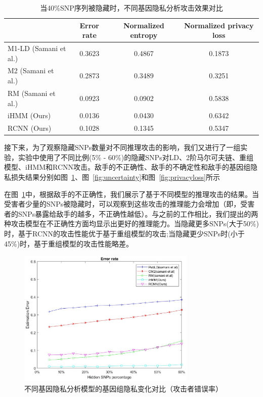 \begin{table}
	\caption{当40\%SNP序列被隐藏时，不同基因隐私分析攻击效果对比}
	\label{tab:performance-40per}
	\begin{tabular}{lccc}
		\hline
		& Error rate & Normalized entropy & Normalized privacy loss \\
		\hline
		M1-LD (Samani et al.) & 0.3623 & 0.4867 & 0.1873 \\
		M2 (Samani et al.)    & 0.2873 & 0.3489 & 0.3251 \\
		RM (Samani et al.)    & 0.0923 & 0.0902 & 0.5838 \\
		iHMM (Ours)          & 0.0136 & 0.0430 & 0.6342 \\
		RCNN (Ours)          & 0.1028 & 0.1345 & 0.5347\\
		\hline
	\end{tabular}
\end{table}

接下来，为了观察隐藏SNPs数量对不同推理攻击的影响，我们又进行了一组实验，实验中使用了不同比例(5\% - 60\%)的隐藏SNPs对LD、2阶马尔可夫链、重组模型、iHMM和RCNN攻击。敌手的不正确性、敌手的不确定性和敌手的基因组隐私损失结果分别如图~\ref{fig:error}、图~\ref{fig:uncertainty}和图~\ref{fig:privacyloss}所示

在图~\ref{fig:error}中，根据敌手的不正确性，我们展示了基于不同模型的推理攻击的结果。当受害者少量的SNPs被隐藏时，可以观察到这些攻击的推理能力会增加（即，受害者的SNPs暴露给敌手的越多，不正确性越低）。与之前的工作相比，我们提出的两种攻击模型在不正确性方面均显示出更好的推理能力。当隐藏更多SNPs(大于50\%)时，基于RCNN的攻击性能优于基于重组模型的攻击;当隐藏更少SNPs时(小于45\%)时，基于重组模型的攻击性能略差。

\begin{figure}
	\centering
	\includegraphics[width = 8.5cm]{./figures/Fig5-genomic-privacy-quantifying-incorrectness.eps}
	\caption{不同基因隐私分析模型的基因组隐私变化对比（攻击者错误率）}
	\label{fig:error}
\end{figure}

